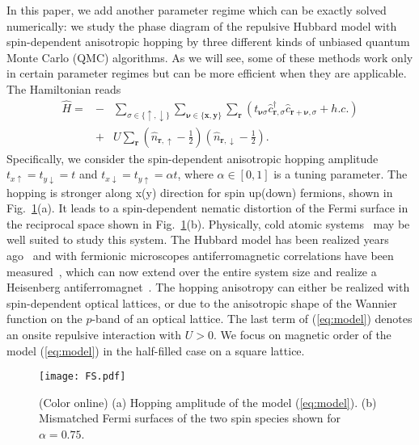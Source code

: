 \documentclass[twocolumn,superscriptaddress,pra,showpacs,longbibliography]{revtex4-1}
\newcommand{\<}{\langle}
\renewcommand{\>}{\rangle}
\begin{document}
In this paper, we add another parameter regime which can  be exactly solved numerically: we study the phase diagram of  the repulsive Hubbard model with spin-dependent anisotropic hopping by three different kinds of unbiased quantum Monte Carlo (QMC) algorithms. 
As we will see, some of these methods work only in certain parameter regimes but can be more efficient when they are applicable.
The Hamiltonian reads
\begin{eqnarray} 
\hat{H} = &-&\sum_{\sigma\in\{\uparrow,\downarrow\}}\sum_{{\pmb{\nu}\in\{\pmb{x,y}\}}} \sum_{\pmb{r}}\left(t_{\pmb{\nu}\sigma}\hat{c}^{\dagger}_{\pmb{r},\sigma} \hat{c}_{\pmb{r}+\pmb{\nu},\sigma} +h.c.\right) \nonumber \\ &+& U \sum_{\pmb{r}}\left(\hat{n}_{\pmb{r},\uparrow}-\frac{1}{2}\right)\left(\hat{n}_{\pmb{r},\downarrow }-\frac{1}{2}\right)
\label{eq:model}. 
\end{eqnarray}
Specifically, we consider the spin-dependent anisotropic hopping amplitude $t_{x\uparrow}=t_{y\downarrow}=t$ and $t_{x\downarrow}=t_{y\uparrow}=\alpha t$, where $\alpha \in [0,1]$ is a tuning parameter. The hopping is stronger along x(y) direction for spin up(down) fermions, shown in Fig.~\ref{fig:FS}(a). It leads to a spin-dependent nematic distortion of the Fermi surface in the reciprocal space shown in Fig.~\ref{fig:FS}(b). 
Physically, cold atomic systems~\cite{Bloch:2008gla, Esslinger:2010ex} may be well suited to study this system. The Hubbard model has been realized years ago~\cite{Jordens2008, Schneider2008} and with fermionic microscopes antiferromagnetic correlations have been measured~\cite{Boll2016, Parsons2016, Cheuk2016}, which can now extend over the entire system size and realize a Heisenberg antiferromagnet~\cite{Mazurenko2016}. 
The hopping anisotropy can either be realized with spin-dependent optical lattices, or due to the anisotropic shape of the Wannier function on the $p$-band of an optical lattice. The last term of (\ref{eq:model}) denotes an onsite repulsive interaction with $U>0$. We focus on magnetic order of the model (\ref{eq:model}) in the half-filled case on a square lattice.  
  
\begin{figure}[tbp]
\centering
\texttt{[image: FS.pdf]}
\caption{(Color online) (a) Hopping amplitude of the model (\ref{eq:model}). (b) Mismatched Fermi surfaces of the two spin species shown for $\alpha = 0.75$.}
\label{fig:FS}
\end{figure}
\end{document}
